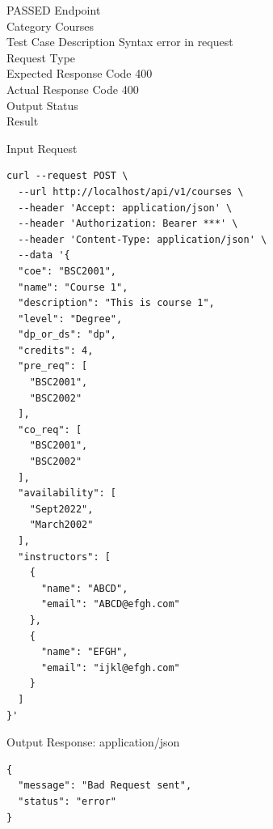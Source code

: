 \begin{testcase}{81}{PASSED}
Endpoint \hfill {}\\
Category \hfill Courses\\
Test Case Description \hfill Syntax error in request\\

Request Type    \hfill {}\\
Expected Response Code    \hfill 400\\
Actual Response Code    \hfill 400\\

Output Status \hfill {}\\
Result \hfill {}

\begin{ipblock}{Input Request}
\begin{verbatim}
curl --request POST \
  --url http://localhost/api/v1/courses \
  --header 'Accept: application/json' \
  --header 'Authorization: Bearer ***' \
  --header 'Content-Type: application/json' \
  --data '{
  "coe": "BSC2001",
  "name": "Course 1",
  "description": "This is course 1",
  "level": "Degree",
  "dp_or_ds": "dp",
  "credits": 4,
  "pre_req": [
    "BSC2001",
    "BSC2002"
  ],
  "co_req": [
    "BSC2001",
    "BSC2002"
  ],
  "availability": [
    "Sept2022",
    "March2002"
  ],
  "instructors": [
    {
      "name": "ABCD",
      "email": "ABCD@efgh.com"
    },
    {
      "name": "EFGH",
      "email": "ijkl@efgh.com"
    }
  ]
}'
\end{verbatim}
\end{ipblock}

\begin{opblock}{Output Response: application/json}
\begin{verbatim}
{
  "message": "Bad Request sent",
  "status": "error"
}
\end{verbatim}
\end{opblock}
\end{testcase}

